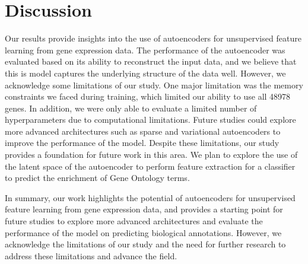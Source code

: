 
\section{Discussion}

Our results provide insights into the use of autoencoders for unsupervised feature
learning from gene expression data. The performance of the autoencoder was evaluated
based on its ability to reconstruct the input data, and we believe that this is model
captures the underlying structure of the data well. However, we acknowledge some
limitations of our study. One major limitation was the memory constraints we faced
during training, which limited our ability to use all 48978 genes. In addition, we were
only able to evaluate a limited number of hyperparameters due to computational
limitations. Future studies could explore more advanced architectures such as sparse and
variational autoencoders to improve the performance of the model. Despite these
limitations, our study provides a foundation for future work in this area.
We plan to explore the use of the latent space of the autoencoder to perform feature
extraction for a classifier to predict the enrichment of Gene Ontology terms.

\vspace{0.2cm}

In summary, our work highlights the potential of autoencoders for unsupervised feature
learning from gene expression data, and provides a starting point for future studies to
explore more advanced architectures and evaluate the performance of the model on
predicting biological annotations. However, we acknowledge the limitations of our study
and the need for further research to address these limitations and advance the field.
